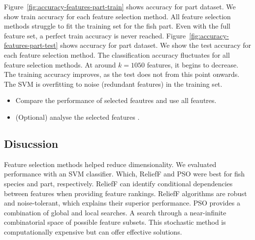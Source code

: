 \documentclass[runningheads]{llncs}
\begin{document}
Figure~\ref{fig:accuracy-features-part-train} shows accuracy for part dataset.
We show train accuracy for each feature selection method.
All feature selection methods struggle to fit the training set for the fish part.
Even with the full feature set, a perfect train accuracy is never reached.
Figure~\ref{fig:accuracy-features-part-test} shows accuracy for part dataset.
We show the test accuracy for each feature selection method.
The classification accuracy fluctuates for all feature selection methods.
At around $k=1050$ features, it begins to decrease.
The training accuracy improves, as the test does not from this point onwards.
The SVM is overfitting to noise (redundant features) in the training set.


\begin{itemize}
  \item Compare the performance of selected feautres and use all feautres. 
  \item (Optional) analyse the selected features .
\end{itemize}


\subsection{Disucssion}
\label{sec:results-feature-selection-discussion}


Feature selection methods helped reduce dimensionality.
We evaluated performance with an SVM classifier.
Which, ReliefF and PSO were best for fish species and part, respectively.
ReliefF can identify conditional dependencies between features when providing feature rankings.
ReliefF algorithms are robust and noise-tolerant, which explains their superior performance.
PSO provides a combination of global and local searches.
A search through a near-infinite combinatorial space of possible feature subsets.
This stochastic method is computationally expensive but can offer effective solutions.
\end{document}
